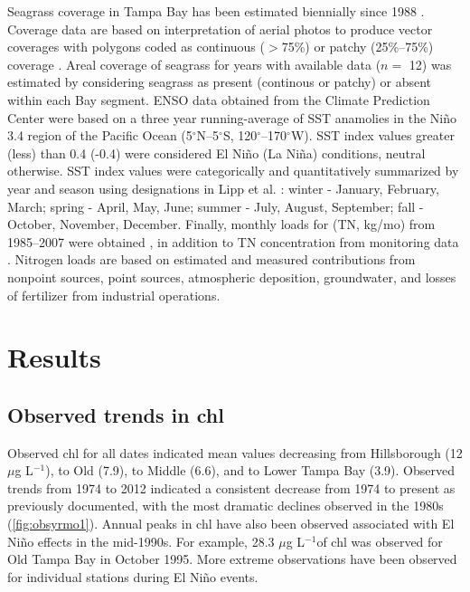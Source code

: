 \documentclass{svjour3}\usepackage[]{graphicx}\usepackage[]{color}
\newcommand{\mugl}{$\mu$g L$^{-1}$}
\begin{document}
Seagrass coverage in Tampa Bay has been estimated biennially since 1988 \cite{Tomasko05}.  Coverage data are based on interpretation of aerial photos to produce vector coverages with polygons coded as continuous ($>$75\%) or patchy (25\%--75\%) coverage \cite{SFWMD13}.  Areal coverage of seagrass for years with available data ($n=$ 12) was estimated by considering seagrass as present (continous or patchy) or absent within each Bay segment.  \ac{ENSO} data obtained from the Climate Prediction Center \cite{CPC13} were based on a three year running-average of \ac{SST} anamolies in the Ni\~{n}o 3.4 region of the Pacific Ocean (5$^{\circ}$N--5$^{\circ}$S, 120$^{\circ}$--170$^{\circ}$W).  \ac{SST} index values greater (less) than 0.4 (-0.4) were considered El Ni\~{n}o (La Ni\~{n}a) conditions, neutral otherwise.  \ac{SST} index values were categorically and quantitatively summarized by year and season using designations in Lipp et al. \cite{Lipp01}: winter - January, February, March; spring - April, May, June; summer - July, August, September; fall - October, November, December.  Finally, monthly loads for  (\acs{TN}, kg/mo) from 1985--2007 were obtained \cite{Zarbock94,Pribble01,Poe05}, in addition to \ac{TN} concentration from monitoring data \cite{TBEP11}.  Nitrogen loads are based on estimated and measured contributions from nonpoint sources, point sources, atmospheric deposition, groundwater, and losses of fertilizer from industrial operations.

\section{Results}

\subsection{Observed trends in \acl{chl}}

Observed \ac{chl} for all dates indicated mean values decreasing from Hillsborough (12 \mugl), to Old (7.9), to Middle (6.6), and to Lower Tampa Bay (3.9).  Observed trends from 1974 to 2012 indicated a consistent decrease from 1974 to present as previously documented, with the most dramatic declines observed in the 1980s (\cref{fig:obsyrmo1}).  Annual peaks in \ac{chl} have also been observed associated with El Ni\~{n}o effects \cite{Greening06} in the mid-1990s.  For example, 28.3 \mugl of \ac{chl} was observed for Old Tampa Bay in October 1995.  More extreme observations have been observed for individual stations during El Ni\~{n}o events. 
\end{document}
